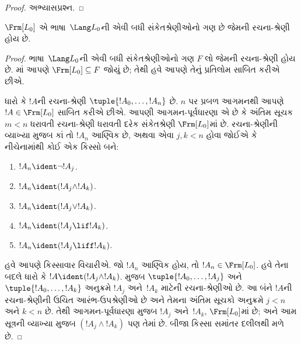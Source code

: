\begin{proof}
અભ્યાસપ્રશ્ન.
\end{proof}

\begin{thm}
$\Frm[L_0]$ એ ભાષા~$\Lang L_0$ની એવી બધી સંકેતશ્રેણીઓનો ગણ છે
જેમની રચના-શ્રેણી હોય છે.
\end{thm}

\begin{proof}
ભાષા~$\Lang L_0$ની એવી બધી સંકેતશ્રેણીઓનો ગણ $F$ લો જેમની
રચના-શ્રેણી હોય છે. માં આપણે
$\Frm[L_0]\subseteq F$ જોયું છે; તેથી હવે આપણે તેનું પ્રતિલોમ
સાબિત કરીએ છીએ.

ધારો કે $!A$ની રચના-શ્રેણી $\tuple{!A_0,\dotsc,!A_n}$ છે. $n$ પર
પ્રબળ આગમનથી આપણે $!A\in\Frm[L_0]$ સાબિત કરીએ છીએ. આપણી
આગમન-પૂર્વધારણા એ છે કે અંતિમ સૂચક $m<n$ ધરાવતી રચના-શ્રેણી ધરાવતી દરેક
સંકેતશ્રેણી $\Frm[L_0]$માં છે. રચના-શ્રેણીની વ્યાખ્યા મુજબ કાં તો
$!A_n$ આણ્વિક છે, અથવા એવા $j,k<n$ હોવા જોઈએ કે નીચેનામાંથી કોઈ એક
કિસ્સો બને:
\begin{enumerate}
    \item $!A_n \ident \lnot !A_j$.%
    \item $!A_n \ident (!A_j \land !A_k)$.%
    \item $!A_n \ident (!A_j \lor !A_k)$.%
    \item $!A_n \ident (!A_j \lif !A_k)$.%
    \item $!A_n \ident (!A_j \liff !A_k)$.%
\end{enumerate}
હવે આપણે કિસ્સાવાર વિચારીએ. જો $!A_n$ આણ્વિક હોય, તો
$!A_n\in\Frm[L_0]$. હવે તેના બદલે ધારો કે $!A\ident
(!A_j\land !A_k)$.  મુજબ
$\tuple{!A_0,\dotsc,!A_j}$ અને $\tuple{!A_0,\dotsc,!A_k}$ અનુક્રમે
$!A_j$ અને~$!A_k$ માટેની રચના-શ્રેણીઓ છે. આ બંને $!A$ની
રચના-શ્રેણીની ઉચિત આરંભ-ઉપશ્રેણીઓ છે અને તેમના અંતિમ સૂચકો અનુક્રમે $j<n$ અને $k<n$ છે.
તેથી આગમન-પૂર્વધારણા મુજબ $!A_j$ અને~$!A_k$, $\Frm[L_0]$માં છે;
અને આમ સૂત્રની વ્યાખ્યા મુજબ $(!A_j\land !A_k)$ પણ તેમાં છે.
બીજા કિસ્સા સમાંતર દલીલથી મળે છે.
\end{proof}
\endgroup


